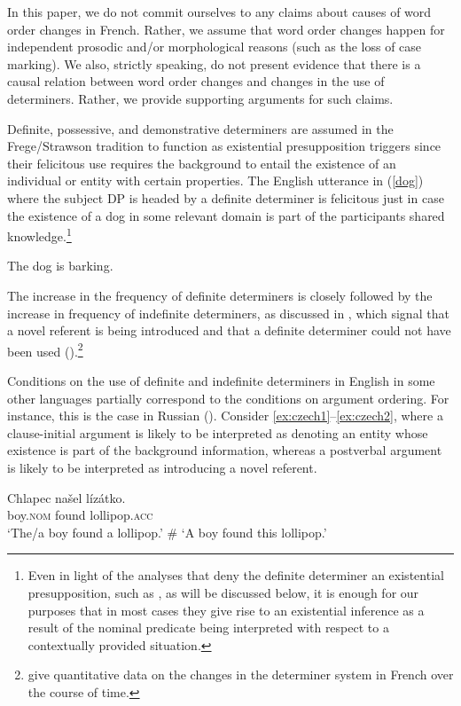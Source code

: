 \documentclass[output=paper,modfonts,nonflat]{langsci/langscibook}
\begin{document}
In this paper, we do not commit ourselves to any claims about causes of word order changes in French. Rather, we assume that word order changes happen for independent prosodic and/or morphological reasons (such as the loss of case marking). We also, strictly speaking, do not present evidence that there is a causal relation between word order changes and changes in the use of determiners. Rather, we provide supporting arguments for such claims.

Definite, possessive, and demonstrative determiners are assumed in the \linebreak Frege/Strawson tradition to function as existential presupposition triggers since their felicitous use requires the background to entail the existence of an individual or entity with certain properties. The English utterance in (\ref{dog}) where the subject DP is headed by a definite determiner is felicitous just in case the existence of a dog in some relevant domain is part of the participants shared knowledge.\footnote{Even in light of the analyses that deny the definite determiner an existential presupposition, such as \citet{CoppockBeaver:2015}, as will be discussed below, it is enough for our purposes that in most cases they give rise to an existential inference as a result of the nominal predicate being interpreted with respect to a contextually provided situation.}

\ea \label{dog}
The dog is barking.
\z

The increase in the frequency of definite determiners is closely followed by the increase in frequency of indefinite determiners, as discussed in \citet{Carlier:2013}, which signal that a novel referent is being introduced and that a definite determiner could not have been used (\citet{Heim:1982,Heim:1991}).\footnote{\citet{SimonenkoCarlier:review} give quantitative data on the changes in the determiner system in French over the course of time.}

Conditions on the use of definite and indefinite determiners in English in some other languages partially correspond to the conditions on argument ordering. For instance, this is the case in Russian (\citealt{Titov:2012}). Consider \ref{ex:czech1}--\ref{ex:czech2}, where a clause-initial argument is likely to be interpreted as denoting an entity whose existence is part of the background information, whereas a postverbal argument is likely to be interpreted as introducing a novel referent.

\ea\label{ex:czech1}
\gll Chlapec na\v{s}el l\'{i}z\'{a}tko.\\
boy.\textsc{nom} found lollipop.\textsc{acc}\\
\glt `The/a boy found a lollipop.' \# `A boy found this lollipop.'
\z
\end{document}
